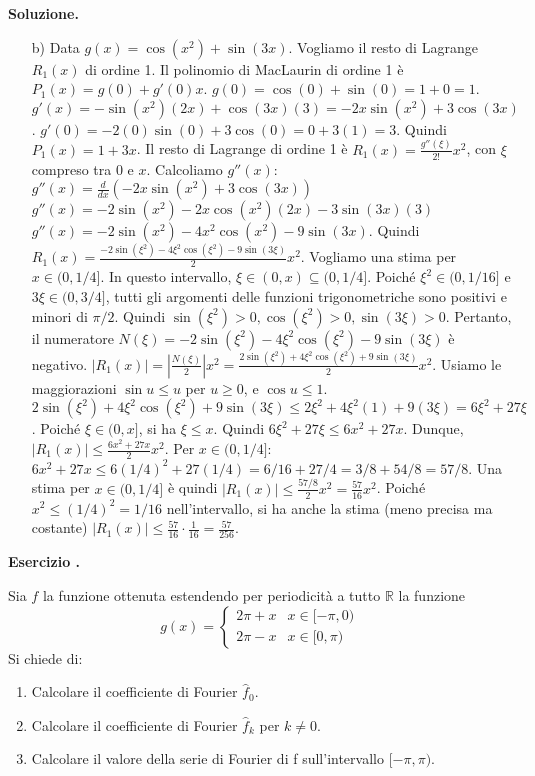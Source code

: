 \documentclass[12pt, a4paper]{article}
\newcounter{examcounter}
\newcounter{exercisecounter}[examcounter]
\newenvironment{exercise}{%
    \stepcounter{exercisecounter}%
    \par\noindent\textbf{Esercizio \theexercisecounter.}\medskip\par
    \normalfont
}{\par\bigskip}
\newenvironment{solution}{%
    \par\noindent\textbf{Soluzione.}\medskip\par
    \normalfont
}{\par\bigskip}
\begin{document}
\begin{solution}
\begin{enumerate}
    \item[b)] Data $g(x) = \cos(x^2) + \sin(3x)$. Vogliamo il resto di Lagrange $R_1(x)$ di ordine 1.
    Il polinomio di MacLaurin di ordine 1 è $P_1(x) = g(0) + g'(0)x$.
    $g(0) = \cos(0) + \sin(0) = 1+0 = 1$.
    $g'(x) = -\sin(x^2)(2x) + \cos(3x)(3) = -2x\sin(x^2) + 3\cos(3x)$.
    $g'(0) = -2(0)\sin(0) + 3\cos(0) = 0 + 3(1) = 3$.
    Quindi $P_1(x) = 1 + 3x$.
    Il resto di Lagrange di ordine 1 è $R_1(x) = \frac{g''(\xi)}{2!}x^2$, con $\xi$ compreso tra $0$ e $x$.
    Calcoliamo $g''(x)$:
    $g''(x) = \frac{d}{dx}(-2x\sin(x^2) + 3\cos(3x))$
    $g''(x) = -2\sin(x^2) -2x\cos(x^2)(2x) -3\sin(3x)(3)$
    $g''(x) = -2\sin(x^2) -4x^2\cos(x^2) -9\sin(3x)$.
    Quindi $R_1(x) = \frac{-2\sin(\xi^2) -4\xi^2\cos(\xi^2) -9\sin(3\xi)}{2}x^2$.
    Vogliamo una stima per $x \in (0, 1/4]$. In questo intervallo, $\xi \in (0, x) \subseteq (0, 1/4]$.
    Poiché $\xi^2 \in (0, 1/16]$ e $3\xi \in (0, 3/4]$, tutti gli argomenti delle funzioni trigonometriche sono positivi e minori di $\pi/2$. Quindi $\sin(\xi^2)>0, \cos(\xi^2)>0, \sin(3\xi)>0$.
    Pertanto, il numeratore $N(\xi) = -2\sin(\xi^2) -4\xi^2\cos(\xi^2) -9\sin(3\xi)$ è negativo.
    $|R_1(x)| = \left|\frac{N(\xi)}{2}\right|x^2 = \frac{2\sin(\xi^2) + 4\xi^2\cos(\xi^2) + 9\sin(3\xi)}{2}x^2$.
    Usiamo le maggiorazioni $\sin u \le u$ per $u \ge 0$, e $\cos u \le 1$.
    $2\sin(\xi^2) + 4\xi^2\cos(\xi^2) + 9\sin(3\xi) \le 2\xi^2 + 4\xi^2(1) + 9(3\xi) = 6\xi^2 + 27\xi$.
    Poiché $\xi \in (0, x]$, si ha $\xi \le x$. Quindi $6\xi^2 + 27\xi \le 6x^2 + 27x$.
    Dunque, $|R_1(x)| \le \frac{6x^2 + 27x}{2}x^2$.
    Per $x \in (0, 1/4]$: $6x^2 + 27x \le 6(1/4)^2 + 27(1/4) = 6/16 + 27/4 = 3/8 + 54/8 = 57/8$.
    Una stima per $x \in (0, 1/4]$ è quindi $|R_1(x)| \le \frac{57/8}{2}x^2 = \frac{57}{16}x^2$.
    Poiché $x^2 \le (1/4)^2 = 1/16$ nell'intervallo, si ha anche la stima (meno precisa ma costante) $|R_1(x)| \le \frac{57}{16} \cdot \frac{1}{16} = \frac{57}{256}$.
\end{enumerate}
\end{solution}
\begin{exercise}[Serie di Fourier]
Sia $f$ la funzione ottenuta estendendo per periodicità a tutto $\mathbb{R}$ la funzione
\[ g(x) = \begin{cases} 2\pi+x & x \in [-\pi,0) \\ 2\pi-x & x \in [0,\pi) \end{cases} \]
Si chiede di:
\begin{enumerate}
    \item Calcolare il coefficiente di Fourier $\hat{f}_{0}$.
    \item Calcolare il coefficiente di Fourier $\hat{f}_{k}$ per $k \ne 0$.
    \item Calcolare il valore della serie di Fourier di f sull'intervallo $[-\pi, \pi)$.
\end{enumerate}
\end{exercise}
\end{document}
